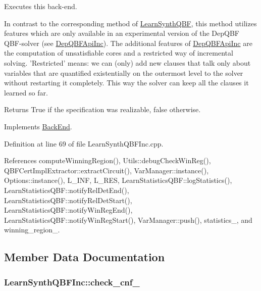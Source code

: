 Executes this back-\/end. 

In contrast to the corresponding method of \hyperlink{classLearnSynthQBF}{Learn\-Synth\-Q\-B\-F}, this method utilizes features which are only available in an experimental version of the Dep\-Q\-B\-F Q\-B\-F-\/solver (see \hyperlink{classDepQBFApiInc}{Dep\-Q\-B\-F\-Api\-Inc}). The additional features of \hyperlink{classDepQBFApiInc}{Dep\-Q\-B\-F\-Api\-Inc} are the computation of unsatisfiable cores and a restricted way of incremental solving. 'Restricted' means\-: we can (only) add new clauses that talk only about variables that are quantified existentially on the outermost level to the solver without restarting it completely. This way the solver can keep all the clauses it learned so far.

\begin{DoxyReturn}{Returns}
True if the specification was realizable, false otherwise. 
\end{DoxyReturn}


Implements \hyperlink{classBackEnd_a099e717dc71e9cc2d838b1ca86340590}{Back\-End}.



Definition at line 69 of file Learn\-Synth\-Q\-B\-F\-Inc.\-cpp.



References compute\-Winning\-Region(), Utils\-::debug\-Check\-Win\-Reg(), Q\-B\-F\-Cert\-Impl\-Extractor\-::extract\-Circuit(), Var\-Manager\-::instance(), Options\-::instance(), L\-\_\-\-I\-N\-F, L\-\_\-\-R\-E\-S, Learn\-Statistics\-Q\-B\-F\-::log\-Statistics(), Learn\-Statistics\-Q\-B\-F\-::notify\-Rel\-Det\-End(), Learn\-Statistics\-Q\-B\-F\-::notify\-Rel\-Det\-Start(), Learn\-Statistics\-Q\-B\-F\-::notify\-Win\-Reg\-End(), Learn\-Statistics\-Q\-B\-F\-::notify\-Win\-Reg\-Start(), Var\-Manager\-::push(), statistics\-\_\-, and winning\-\_\-region\-\_\-.



\subsection{Member Data Documentation}
\hypertarget{classLearnSynthQBFInc_ac0ab1f2bc45740dc3e3e28e04a98d62d}{
\subsubsection[{check\-\_\-cnf\-\_\-}]{ Learn\-Synth\-Q\-B\-F\-Inc\-::check\-\_\-cnf\-\_\-\hspace{0.3cm}{\ttfamily [protected]}}}\label{classLearnSynthQBFInc_ac0ab1f2bc45740dc3e3e28e04a98d62d}


